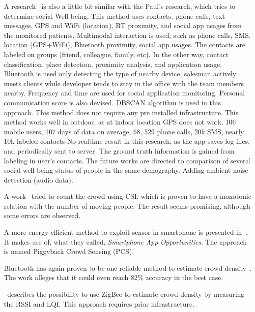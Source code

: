\documentclass{article}
\begin{document}
A research~\cite{thesis030} is also a little bit similar with the Paul's research, which tries to determine social Well being. This method uses contacts, phone calls, text messages, GPS and WiFi (location), BT proximity, and social app usages from the monitored patients. Multimodal interaction is used, such as phone calls, SMS, location (GPS+WiFi), Bluetooth proximity, social app usages. The contacts are labeled on groups (friend, colleague, family, etc). In the other way, contact classification, place detection, proximity analysis, and application usage. Bluetooth is used only detecting the type of nearby device, salesman actively meets clients while developer tends to stay in the office with the team members nearby. Frequency and time are used for social application monitoring. Personal communication score is also devised. DBSCAN algorithm is used in this approach. This method does not require any pre installed infrastructure. This method works well in outdoor, as at indoor location GPS does not work. 106 mobile users, 107 days of data on average, 68, 529 phone calls, 20k SMS, nearly 10k labeled contacts No realtime result in this research, as the app saves log files, and periodically sent to server.
The ground truth information is gained from labeling in user's contacts.
The future works are directed to comparison of several social well being status of people in the same demography. Adding ambient noise detection (audio data).













A work~\cite{thesis006} tried to count the crowd using CSI, which is proven to have a monotonic relation with the number of moving people. The result seems promising, although some errors are observed.

A more energy efficient method to exploit sensor in smartphone is presented in~\cite{thesis040}. It makes use of, what they called, \textit{Smartphone App Opportunities}. The approach is named Piggyback Crowd Sensing (PCS).

Bluetooth has again proven to be one reliable method to estimate crowd density~\cite{thesis041}. The work alleges that it could even reach 82\% accuracy in the best case.

\cite{thesis042}~describes the possibility to use ZigBee to estimate crowd density by measuring the RSSI and LQI. This approach requires prior infrastructure.
\end{document}
